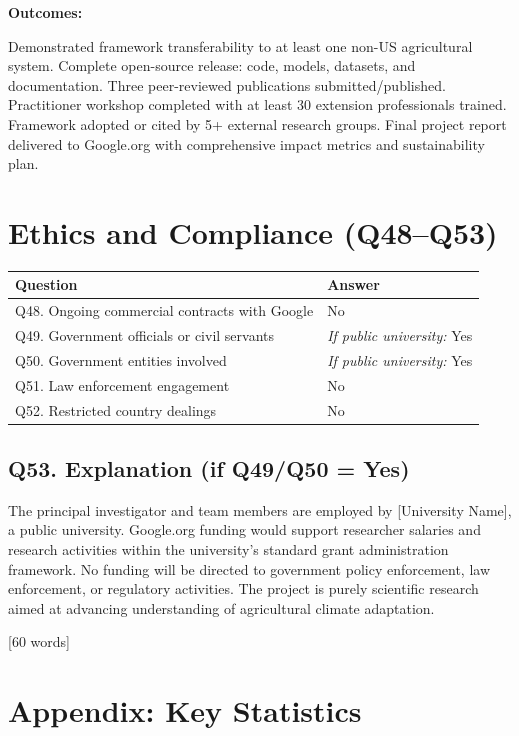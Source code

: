 \documentclass[11pt,letterpaper]{article}
\newcommand{\answer}[1]{%
    \vspace{0.2em}%
    \noindent\colorbox{answerbox}{\parbox{\dimexpr\textwidth-2\fboxsep}{%
        \vspace{0.4em}#1\vspace{0.4em}%
    }}%
    \vspace{0.5em}%
}
\newcommand{\wordcount}[1]{%
    \hfill{\scriptsize\textcolor{notegray}{[#1 words]}}%
}
\begin{document}
\textbf{Outcomes:}
\answer{Demonstrated framework transferability to at least one non-US agricultural system. Complete open-source release: code, models, datasets, and documentation. Three peer-reviewed publications submitted/published. Practitioner workshop completed with at least 30 extension professionals trained. Framework adopted or cited by 5+ external research groups. Final project report delivered to Google.org with comprehensive impact metrics and sustainability plan.}

\section{Ethics and Compliance (Q48--Q53)}

\begin{longtable}{p{8cm} p{6cm}}
\toprule
\textbf{Question} & \textbf{Answer} \\
\midrule
Q48. Ongoing commercial contracts with Google & No \\
Q49. Government officials or civil servants & \textit{If public university:} Yes \\
Q50. Government entities involved & \textit{If public university:} Yes \\
Q51. Law enforcement engagement & No \\
Q52. Restricted country dealings & No \\
\bottomrule
\end{longtable}

\subsection{Q53. Explanation (if Q49/Q50 = Yes)}
\answer{The principal investigator and team members are employed by [University Name], a public university. Google.org funding would support researcher salaries and research activities within the university's standard grant administration framework. No funding will be directed to government policy enforcement, law enforcement, or regulatory activities. The project is purely scientific research aimed at advancing understanding of agricultural climate adaptation.}
\wordcount{60}

\newpage
\section*{Appendix: Key Statistics}
\end{document}
